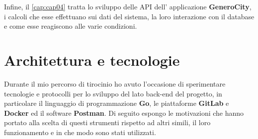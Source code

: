 \documentclass[italian, Lau, oneside, nodefaultfont, noexaminfo]{sapthesis}
\begin{document}
Infine,  il  \autoref{cap:cap04} tratta lo sviluppo delle API dell' applicazione \textbf{GeneroCity}, i calcoli che esse effettuano sui dati del sistema, la loro interazione con il database e come esse reagiscono alle varie condizioni.\\

 


\bigskip

\chapter{Architettura e tecnologie}
\label{cap:cap02}

Durante il mio percorso di tirocinio ho avuto l'occasione di sperimentare  tecnologie e protocolli per lo sviluppo del lato back-end del progetto, in particolare il linguaggio di programmazione \textbf{Go}, le piattaforme \textbf{GitLab} e \textbf{Docker} ed il software \textbf{Postman}. Di seguito espongo le motivazioni che hanno portato alla  scelta di questi strumenti rispetto ad altri simili, il loro funzionamento e in che modo sono stati utilizzati.
\end{document}
